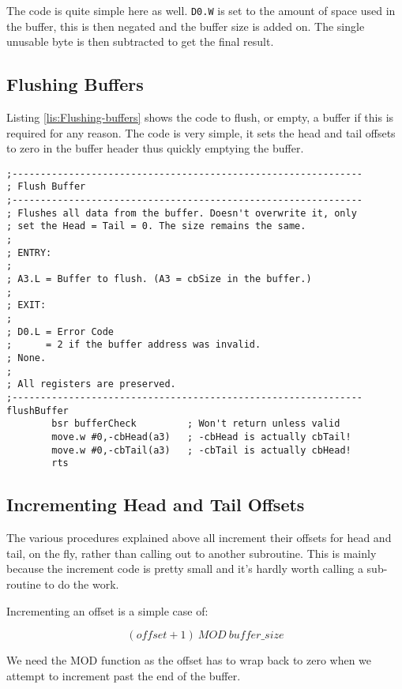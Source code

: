 The code is quite simple here as well. \texttt{D0.W} is set to the
amount of space used in the buffer, this is then negated and the buffer
size is added on. The single unusable byte is then subtracted to get
the final result. 

\subsection{Flushing Buffers}

Listing \ref{lis:Flushing-buffers} shows the code to flush, or empty,
a buffer if this is required for any reason. The code is very simple,
it sets the head and tail offsets to zero in the buffer header thus
quickly emptying the buffer.

\begin{lstlisting}[caption={Flushing buffers},label={lis:Flushing-buffers}]
;--------------------------------------------------------------
; Flush Buffer
;--------------------------------------------------------------
; Flushes all data from the buffer. Doesn't overwrite it, only 
; set the Head = Tail = 0. The size remains the same.
; 
; ENTRY:
;
; A3.L = Buffer to flush. (A3 = cbSize in the buffer.)
;
; EXIT:
;
; D0.L = Error Code
;      = 2 if the buffer address was invalid.
; None.
;
; All registers are preserved.
;--------------------------------------------------------------
flushBuffer
        bsr bufferCheck         ; Won't return unless valid
        move.w #0,-cbHead(a3)   ; -cbHead is actually cbTail!        
        move.w #0,-cbTail(a3)   ; -cbTail is actually cbHead!
        rts

\end{lstlisting}


\subsection{Incrementing Head and Tail Offsets}

The various procedures explained above all increment their offsets
for head and tail, on the fly, rather than calling out to another
subroutine. This is mainly because the increment code is pretty small
and it's hardly worth calling a sub-routine to do the work.

Incrementing an offset is a simple case of:

\[
\left(offset+1\right)\ MOD\ buffer\_size
\]

We need the MOD function as the offset has to wrap back to zero when
we attempt to increment past the end of the buffer. 

